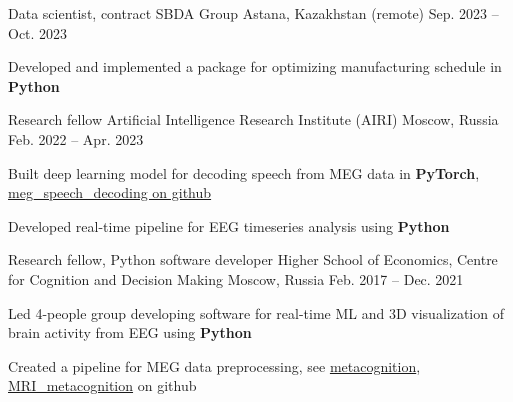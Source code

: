 
\begin{cventries}
  \cventry
    {Data scientist, contract}
    {SBDA Group}
    {Astana, Kazakhstan (remote)}
    {Sep. 2023 -- Oct. 2023}
    {
      \begin{cvitems}
          \item Developed and implemented a package for optimizing manufacturing schedule in \textbf{Python}
      \end{cvitems}
    }
  \cventry
    {Research fellow}
    {Artificial Intelligence Research Institute (AIRI)}
    {Moscow, Russia}
    {Feb. 2022 -- Apr. 2023}
    {
      \begin{cvitems}
      \item Built deep learning model for decoding speech from MEG data in \textbf{PyTorch},
          \href{https://github.com/dmalt/meg_speech_decoding}{meg\_speech\_decoding on github}
      \item Developed real-time pipeline for EEG timeseries analysis using
          \textbf{Python}
      \end{cvitems}
    }
  \cventry
    {Research fellow, Python software developer}
    {Higher School of Economics, Centre for Cognition and Decision Making}
    {Moscow, Russia}
    {Feb. 2017 -- Dec. 2021}
    {
      \begin{cvitems}
      \item{Led 4-people group developing software for real-time ML and 3D visualization of brain activity from EEG using \textbf{Python}}
      \item{Created a pipeline for MEG data preprocessing, see \href{https://github.com/dmalt/metacognition}{metacognition}, \href{https://github.com/dmalt/MRI_metacognition}{MRI\_metacognition}} on github
      \end{cvitems}
    }

\end{cventries}

